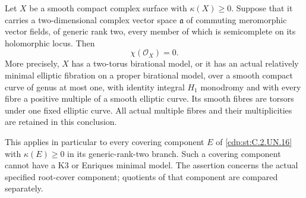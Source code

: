 \begin{proposition}\label{cdp:st:C.2.UN.22}

Let $X$ be a smooth compact complex surface with
$\kappa(X)\ge0$. Suppose that it carries a two-dimensional
complex vector space $\mathfrak a$ of commuting meromorphic
vector fields, of generic rank two, every member of which
is semicomplete on its holomorphic locus. Then
\[
                         \chi(\mathcal O_X)=0.
                                                               \tag{C.RF.5}\label{cdp:eq:C.RF.5}
\]
More precisely, $X$ has a two-torus birational model,
or it has an actual relatively minimal elliptic fibration
on a proper birational model, over a smooth compact curve
of genus at most one, with identity integral $H_1$ monodromy
and with every fibre a positive multiple of a smooth elliptic
curve. Its smooth fibres are torsors under one fixed elliptic
curve. All actual multiple fibres and their multiplicities
are retained in this conclusion.

This applies in particular to every covering component
$E$ of \ref{cdp:st:C.2.UN.16} with $\kappa(E)\ge0$ in its
generic-rank-two branch. Such a covering component cannot
have a K3 or Enriques minimal model. The assertion concerns
the actual specified root-cover component; quotients of that
component are compared separately.
\end{proposition}


